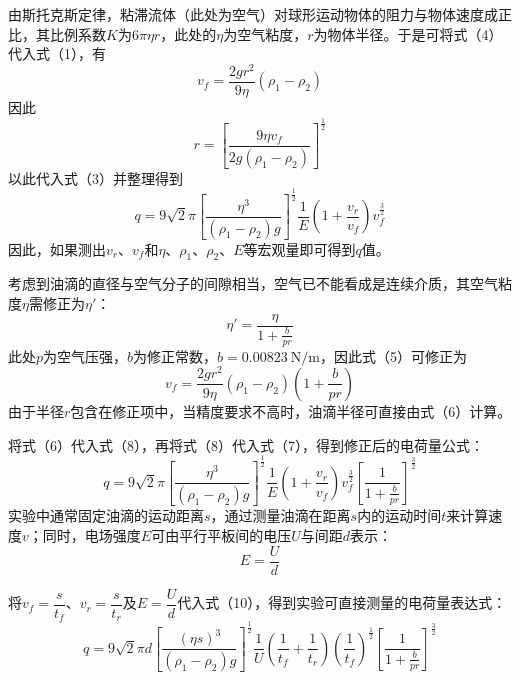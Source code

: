 \documentclass[12pt]{article}
\begin{document}
由斯托克斯定律，粘滞流体（此处为空气）对球形运动物体的阻力与物体速度成正比，其比例系数$K$为$6\pi \eta r$，此处的$\eta$为空气粘度，$r$为物体半径。于是可将式（4）代入式（1），有
\begin{equation}
    v_f = \frac{2gr^2}{9\eta} (\rho_1 - \rho_2)
\end{equation}
因此
\begin{equation}
    r = \left[ \frac{9\eta v_f}{2g(\rho_1 - \rho_2)} \right]^{\frac{1}{2}}
\end{equation}
以此代入式（3）并整理得到
\begin{equation}
    q = 9\sqrt{2}\pi \left[ \frac{\eta^3}{(\rho_1 - \rho_2)g} \right]^{\frac{1}{2}} \frac{1}{E} \left( 1 + \frac{v_r}{v_f} \right) v_f^{\frac{3}{2}}
\end{equation}
因此，如果测出$v_r$、$v_f$和$\eta$、$\rho_1$、$\rho_2$、$E$等宏观量即可得到$q$值。

考虑到油滴的直径与空气分子的间隙相当，空气已不能看成是连续介质，其空气粘度$\eta$需修正为$\eta'$：
\begin{equation}
\eta' = \frac{\eta}{1 + \frac{b}{pr}}
\end{equation}
此处$p$为空气压强，$b$为修正常数，$b=0.00823\ \text{N/m}$，因此式（5）可修正为
\begin{equation}
v_f = \frac{2gr^2}{9\eta} (\rho_1 - \rho_2) \left(1 + \frac{b}{pr}\right)
\end{equation}
由于半径$r$包含在修正项中，当精度要求不高时，油滴半径可直接由式（6）计算。

将式（6）代入式（8），再将式（8）代入式（7），得到修正后的电荷量公式：
\begin{equation}
q = 9\sqrt{2}\pi \left[ \frac{\eta^3}{(\rho_1 - \rho_2)g} \right]^{\frac{1}{2}} \frac{1}{E} \left(1 + \frac{v_r}{v_f}\right) v_f^{\frac{3}{2}} \left[ \frac{1}{1 + \frac{b}{pr}} \right]^{\frac{3}{2}}
\end{equation}
实验中通常固定油滴的运动距离$s$，通过测量油滴在距离$s$内的运动时间$t$来计算速度$v$；同时，电场强度$E$可由平行平板间的电压$U$与间距$d$表示：
\begin{equation*}
    E = \frac{U}{d}
\end{equation*}

将$v_f = \dfrac{s}{t_f}$、$v_r = \dfrac{s}{t_r}$及$E = \dfrac{U}{d}$代入式（10），得到实验可直接测量的电荷量表达式：
\begin{equation}
    q = 9\sqrt{2}\pi d \left[ \frac{(\eta s)^3}{(\rho_1 - \rho_2)g} \right]^{\frac{1}{2}} \frac{1}{U} \left( \frac{1}{t_f} + \frac{1}{t_r} \right) \left( \frac{1}{t_f} \right)^{\frac{1}{2}} \left[ \frac{1}{1 + \frac{b}{pr}} \right]^{\frac{3}{2}}
\end{equation}
\end{document}
